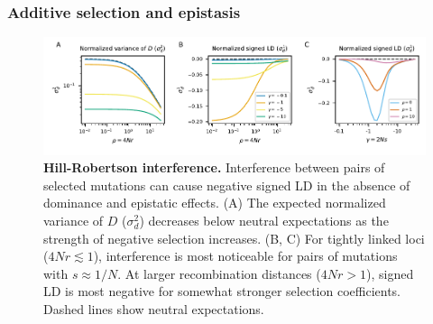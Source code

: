 \documentclass[]{article}
\begin{document}
\subsubsection{Additive selection and epistasis}
\label{sec:additive-selection}

\begin{figure}[tb!]
    \internallinenumbers
    \centering
    \includegraphics{../figures/hill_robertson}
    \caption{
        \textbf{Hill-Robertson interference.}
        Interference between pairs of selected mutations can cause negative
        signed LD in the absence of dominance and epistatic effects.
        (A) The expected normalized variance of $D$ (\(\sigma_d^2\))
        decreases below neutral expectations
        as the strength of negative selection increases.
        (B, C) For tightly linked loci (\(4Nr \lesssim 1\)), interference is most
        noticeable for pairs of mutations with \(s \approx 1/N\).
        At larger recombination distances (\(4Nr > 1\)), signed LD is most
        negative for somewhat stronger selection coefficients.
        Dashed lines show neutral expectations.
    }
    \label{fig:HillRobertson}
\end{figure}
\end{document}
